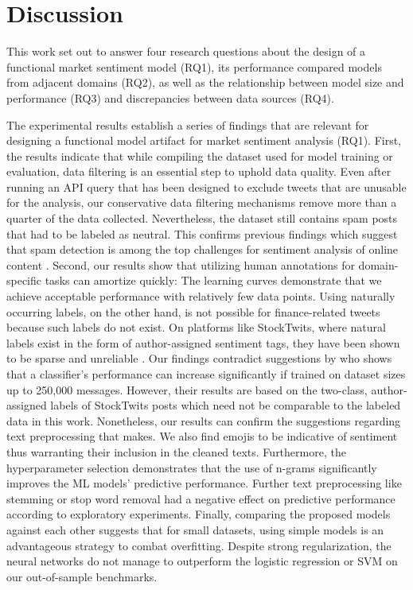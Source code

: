 \section{Discussion}

This work set out to answer four research questions about the design of a functional market sentiment model (RQ1), its performance compared models from adjacent domains (RQ2), as well as the relationship between model size and performance (RQ3) and discrepancies between data sources (RQ4).

The experimental results establish a series of findings that are relevant for designing a functional model artifact for market sentiment analysis (RQ1). First, the results indicate that while compiling the dataset used for model training or evaluation, data filtering is an essential step to uphold data quality. Even after running an API query that has been designed to exclude tweets that are unusable for the analysis, our conservative data filtering mechanisms remove more than a quarter of the data collected. Nevertheless, the dataset still contains spam posts that had to be labeled as neutral. This confirms previous findings which suggest that spam detection is among the top challenges for sentiment analysis of online content . Second, our results show that utilizing human annotations for domain-specific tasks can amortize quickly: The learning curves demonstrate that we achieve acceptable performance with relatively few data points. Using naturally occurring labels, on the other hand, is not possible for finance-related tweets because such labels do not exist. On platforms like StockTwits, where natural labels exist in the form of author-assigned sentiment tags, they have been shown to be sparse and unreliable . Our findings contradict suggestions by  who shows that a classifier's performance can increase significantly if trained on dataset sizes up to 250,000 messages. However, their results are based on the two-class, author-assigned labels of StockTwits posts which need not be comparable to the labeled data in this work. Nonetheless, our results can confirm the suggestions regarding text preprocessing that  makes. We also find emojis to be indicative of sentiment thus warranting their inclusion in the cleaned texts. Furthermore, the hyperparameter selection demonstrates that the use of n-grams significantly improves the ML models' predictive performance. Further text preprocessing like stemming or stop word removal had a negative effect on predictive performance according to exploratory experiments. Finally, comparing the proposed models against each other suggests that for small datasets, using simple models is an advantageous strategy to combat overfitting. Despite strong regularization, the neural networks do not manage to outperform the logistic regression or SVM on our out-of-sample benchmarks.

